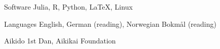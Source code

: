 

\begin{cvskills}

  \cvskill
    {Software} %
    {Julia, R, Python, \LaTeX, Linux} %

  \cvskill
    {Languages} %
    {English, German (reading), Norwegian Bokmål (reading)} %

  \cvskill
    {Aikido} %
    {1st Dan, Aikikai Foundation} %


\end{cvskills}
